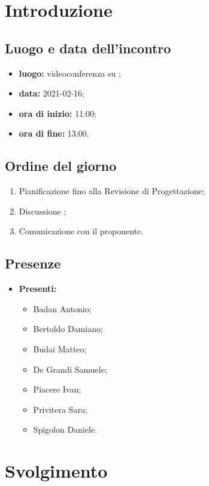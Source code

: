 \section*{Introduzione}
\subsection*{Luogo e data dell'incontro}
\begin{itemize}
\item \textbf{luogo:} videoconferenza su ;
\item \textbf{data:} 2021-02-16;
\item \textbf{ora di inizio:} 11:00;
\item \textbf{ora di fine:} 13:00.
\end{itemize}

\subsection*{Ordine del giorno}
\begin{enumerate}
	\item Pianificazione fino alla Revisione di Progettazione;
	\item Discussione ;
	\item Comunicazione con il proponente.
\end{enumerate}

\subsection*{Presenze}
\begin{itemize}
	\item \textbf{Presenti:}
	\begin{itemize}
		\item Badan Antonio;
		\item Bertoldo Damiano;
		\item Budai Matteo;
		\item De Grandi Samuele;
		\item Piacere Ivan;
		\item Privitera Sara;
		\item Spigolon Daniele.
	\end{itemize}
\end{itemize}

\section*{Svolgimento}
